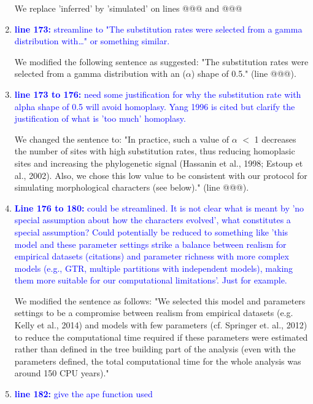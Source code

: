 \documentclass[12pt,letterpaper]{article}
\begin{document}
\begin{enumerate}
We replace 'inferred' by 'simulated' on lines @@@ and @@@ %

\item{\textcolor{blue}{\textbf{line 173:} streamline to "The substitution rates were selected from a gamma distribution with…" or something similar. }}

We modified the following sentence as suggested: "The substitution rates were selected from a gamma distribution with an ($\alpha$) shape of 0.5." (line @@@).

\item{\textcolor{blue}{\textbf{line 173 to 176:} need some justification for why the substitution rate with alpha shape of 0.5  will avoid homoplasy. Yang 1996 is cited but clarify the justification of what is 'too much' homoplasy. }}

We changed the sentence to:
"In practice, such a value of $\alpha$ $<$ 1 decreases the number of sites with high substitution rates, thus reducing homoplasic sites and increasing the phylogenetic signal (Hassanin et al., 1998; Estoup et al., 2002).%
Also, we chose this low value to be consistent with our protocol for simulating morphological characters (see below)." (line @@@).

\item{\textcolor{blue}{\textbf{Line 176 to 180:} could be streamlined. It is not clear what is meant by 'no special assumption about how the characters evolved', what constitutes a special assumption? Could potentially be reduced to something like 'this model and these parameter settings strike a balance between realism for empirical datasets (citations) and parameter richness with more complex models (e.g., GTR, multiple partitions with independent models), making them more suitable for our computational limitations'. Just for example.}}

We modified the sentence as follows:
"We selected this model and parameters settings to be a compromise between realism from empirical datasets (e.g. Kelly et al., 2014) and models with few parameters (cf. Springer et. al., 2012) to reduce the computational time required if these parameters were estimated rather than defined in the tree building part of the analysis (even with the parameters defined, the total computational time for the whole analysis was around 150 CPU years)."

\item{\textcolor{blue}{\textbf{line 182:} give the ape function used}}


\end{enumerate}
\end{document}
